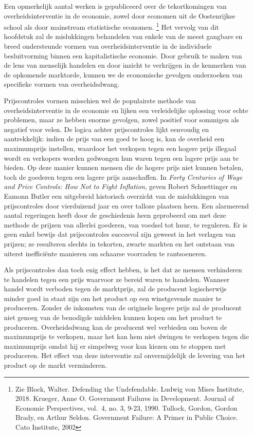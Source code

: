 \documentclass[
  a5paper,
  smalldemyvopaper,11pt,twoside,onecolumn,openright,extrafontsizes,
hidelinks]{memoir}
\begin{document}
Een opmerkelijk aantal werken is gepubliceerd over de tekortkomingen van
overheidsinterventie in de economie, zowel door economen uit de
Oostenrijkse school als door mainstream etatistische economen.
\footnote{Zie Block, Walter. Defending the Undefendable. Ludwig von
  Mises Institute, 2018. Krueger, Anne O. Government Failures in
  Development. Journal of Economic Perspectives, vol.~4, no. 3, 9-23,
  1990. Tullock, Gordon, Gordon Brady, en Arthur Seldon. Government
  Failure: A Primer in Public Choice. Cato Institute, 2002} Het vervolg
van dit hoofdstuk zal de mislukkingen behandelen van enkele van de meest
gangbare en breed ondersteunde vormen van overheidsinterventie in de
individuele besluitvorming binnen een kapitalistische economie. Door
gebruik te maken van de lens van menselijk handelen en door inzicht te
verkrijgen in de kenmerken van de opkomende marktorde, kunnen we de
economische gevolgen onderzoeken van specifieke vormen van
overheidsdwang.

Prijscontroles vormen misschien wel de populairste methode van
overheidsinterventie in de economie en lijken een verleidelijke
oplossing voor echte problemen, maar ze hebben enorme gevolgen, zowel
positief voor sommigen als negatief voor velen. De logica achter
prijscontroles lijkt eenvoudig en aantrekkelijk: indien de prijs van een
goed te hoog is, kan de overheid een maximumprijs instellen, waardoor
het verkopen tegen een hogere prijs illegaal wordt en verkopers worden
gedwongen hun waren tegen een lagere prijs aan te bieden. Op deze manier
kunnen mensen die de hogere prijs niet kunnen betalen, toch de goederen
tegen een lagere prijs aanschaffen. In \emph{Forty Centuries of Wage and
Price Controls: How Not to Fight Inflation}, geven Robert Schuettinger
en Eamonn Butler een uitgebreid historisch overzicht van de mislukkingen
van prijscontroles door vierduizend jaar en over talloze plaatsen heen.
Een alarmerend aantal regeringen heeft door de geschiedenis heen
geprobeerd om met deze methode de prijzen van allerlei goederen, van
voedsel tot huur, te reguleren. Er is geen enkel bewijs dat
prijscontroles succesvol zijn geweest in het verlagen van prijzen; ze
resulteren slechts in tekorten, zwarte markten en het ontstaan van
uiterst inefficiënte manieren om schaarse voorraden te rantsoeneren.

Als prijscontroles dan toch enig effect hebben, is het dat ze mensen
verhinderen te handelen tegen een prijs waarvoor ze bereid waren te
handelen. Wanneer handel wordt verboden tegen de marktprijs, zal de
producent logischerwijs minder goed in staat zijn om het product op een
winstgevende manier te produceren. Zonder de inkomsten van de originele
hogere prijs zal de producent niet genoeg van de benodigde middelen
kunnen kopen om het product te produceren. Overheidsdwang kan de
producent wel verbieden om boven de maximumprijs te verkopen, maar het
kan hem niet dwingen te verkopen tegen die maximumprijs omdat hij er
simpelweg voor kan kiezen om te stoppen met produceren. Het effect van
deze interventie zal onvermijdelijk de levering van het product op de
markt verminderen.
\end{document}
